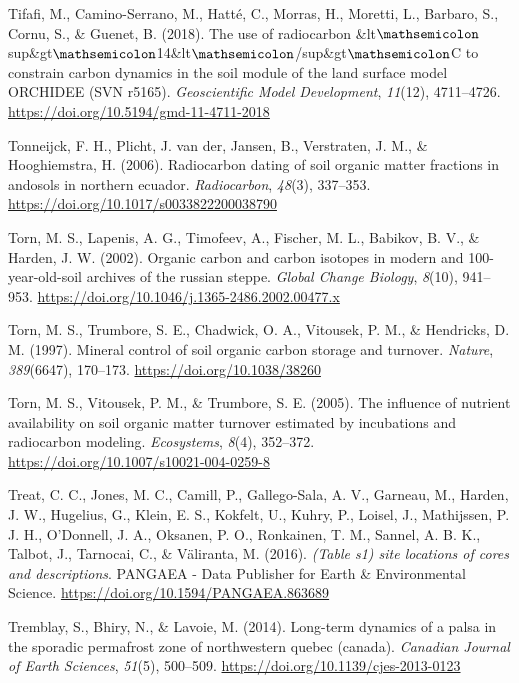 \documentclass[]{article}
\begin{document}
\leavevmode\hypertarget{ref-Tifafi_2018}{}%
Tifafi, M., Camino-Serrano, M., Hatté, C., Morras, H., Moretti, L.,
Barbaro, S., Cornu, S., \& Guenet, B. (2018). The use of radiocarbon
\&lt\(\mathsemicolon\)sup\&gt\(\mathsemicolon\)14\&lt\(\mathsemicolon\)/sup\&gt\(\mathsemicolon\)C
to constrain carbon dynamics in the soil module of the land surface
model ORCHIDEE (SVN r5165). \emph{Geoscientific Model Development},
\emph{11}(12), 4711--4726.
\url{https://doi.org/10.5194/gmd-11-4711-2018}

\leavevmode\hypertarget{ref-Tonneijck_2006}{}%
Tonneijck, F. H., Plicht, J. van der, Jansen, B., Verstraten, J. M., \&
Hooghiemstra, H. (2006). Radiocarbon dating of soil organic matter
fractions in andosols in northern ecuador. \emph{Radiocarbon},
\emph{48}(3), 337--353. \url{https://doi.org/10.1017/s0033822200038790}

\leavevmode\hypertarget{ref-Torn_2002}{}%
Torn, M. S., Lapenis, A. G., Timofeev, A., Fischer, M. L., Babikov, B.
V., \& Harden, J. W. (2002). Organic carbon and carbon isotopes in
modern and 100-year-old-soil archives of the russian steppe.
\emph{Global Change Biology}, \emph{8}(10), 941--953.
\url{https://doi.org/10.1046/j.1365-2486.2002.00477.x}

\leavevmode\hypertarget{ref-Torn_1997}{}%
Torn, M. S., Trumbore, S. E., Chadwick, O. A., Vitousek, P. M., \&
Hendricks, D. M. (1997). Mineral control of soil organic carbon storage
and turnover. \emph{Nature}, \emph{389}(6647), 170--173.
\url{https://doi.org/10.1038/38260}

\leavevmode\hypertarget{ref-Torn_2005}{}%
Torn, M. S., Vitousek, P. M., \& Trumbore, S. E. (2005). The influence
of nutrient availability on soil organic matter turnover estimated by
incubations and radiocarbon modeling. \emph{Ecosystems}, \emph{8}(4),
352--372. \url{https://doi.org/10.1007/s10021-004-0259-8}

\leavevmode\hypertarget{ref-https:ux2fux2fdoi.orgux2f10.1594ux2fpangaea.863689}{}%
Treat, C. C., Jones, M. C., Camill, P., Gallego-Sala, A. V., Garneau,
M., Harden, J. W., Hugelius, G., Klein, E. S., Kokfelt, U., Kuhry, P.,
Loisel, J., Mathijssen, P. J. H., O'Donnell, J. A., Oksanen, P. O.,
Ronkainen, T. M., Sannel, A. B. K., Talbot, J., Tarnocai, C., \&
Väliranta, M. (2016). \emph{(Table s1) site locations of cores and
descriptions}. PANGAEA - Data Publisher for Earth \& Environmental
Science. \url{https://doi.org/10.1594/PANGAEA.863689}

\leavevmode\hypertarget{ref-Tremblay_2014}{}%
Tremblay, S., Bhiry, N., \& Lavoie, M. (2014). Long-term dynamics of a
palsa in the sporadic permafrost zone of northwestern quebec (canada).
\emph{Canadian Journal of Earth Sciences}, \emph{51}(5), 500--509.
\url{https://doi.org/10.1139/cjes-2013-0123}
\end{document}

